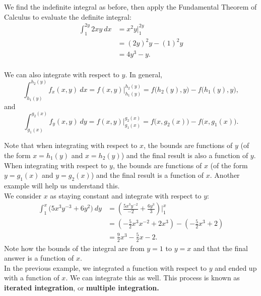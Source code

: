 \enlargethispage{9\baselineskip}
{We find the indefinite integral as before, then apply the Fundamental Theorem of Calculus to evaluate the definite integral:
\begin{align*}
\int_1^{2y} 2xy\ dx &= x^2y\Big|_1^{2y}\\
			&= (2y)^2y - (1)^2y \\
			&= 4y^3-y.
\end{align*}
\baselineskip
}\\

We can also integrate with respect to $y$. In general,
$$\int_{h_1(y)}^{h_2(y)} f_x(x,y)\ dx = f(x,y)\Big|_{h_1(y)}^{h_2(y)} = f\big(h_2(y),y\big)-f\big(h_1(y),y\big),$$
and
$$\int_{g_1(x)}^{g_2(x)} f_y(x,y)\ dy = f(x,y)\Big|_{g_1(x)}^{g_2(x)} = f\big(x,g_2(x)\big)-f\big(x,g_1(x)\big).$$

Note that when integrating with respect to $x$, the bounds are functions of $y$ (of the form $x=h_1(y)$ and $x=h_2(y)$) and the final result is also a function of $y$. When integrating with respect to $y$, the bounds are functions of $x$ (of the form $y=g_1(x)$ and $y=g_2(x)$) and the final result is a function of $x$. Another example will help us understand this.\\

{We consider $x$ as staying constant and integrate with respect to $y$:
\begin{align*}
\int_1^x\big(5x^3y^{-3}+6y^2\big)\ dy & = \left(\frac{5x^3y^{-2}}{-2}+\frac{6y^3}{3}\right)\Bigg|_1^x \\
						&= \left(-\frac52x^3x^{-2}+2x^3\right) - \left(-\frac52x^3+2\right) \\
						&= \frac92x^3-\frac52x-2.
\end{align*}
Note how the bounds of the integral are from $y=1$ to $y=x$ and that the final answer is a function of $x$.
}\\

In the previous example, we integrated a function with respect to $y$ and ended up with a function of $x$. We can integrate this as well. This process is known as \textbf{iterated integration}, or \textbf{multiple integration.}\\

